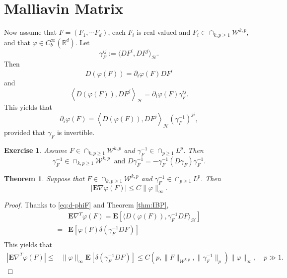 \documentclass[twoside, 12pt]{book}
\numberwithin{equation}{chapter}
\newtheorem{theorem}{Theorem}[section]
\newtheorem{exercise}{Exercise}[section]
\def\cH{{\mathcal H}}
\def\mR{{\mathbb R}}
\def\bE{{\mathbf E}}
\def\sW{{\mathscr W}}
\def\l{\left}
\def\r{\right}
\def\<{\langle}
\def\>{\rangle}
\def\geq{\geqslant}
\def\leq{\leqslant}
\begin{document}
    
    \section{Malliavin Matrix}
    Now assume that $F=(F_1,\cdots F_d)$, each $F_i$ is real-valued and $F_i\in \cap_{k,p\geq 1}\sW^{k,p}$, and that $\varphi\in C^\infty_b(\mR^d)$. Let 
    \[
        \gamma_F^{ij}:= \<DF^i, DF^j\>_{\cH}. 
    \]
    Then 
    \[
        D(\varphi(F))= \partial_i \varphi(F) D F^i
    \]
    and 
    \[
        \left\langle D(\varphi(F)), D F^j\right\rangle_\cH= \partial_i \varphi(F) \gamma_F^{i j} . 
    \]
    This yields that 
    \begin{equation}\label{eq:d-phiF}
    	\partial_i \varphi(F)= \left\langle D(\varphi(F)), D F^j\right\rangle_{\cH}\left(\gamma_F^{-1}\right)^{j i},
    \end{equation}
    provided that $\gamma_{F}$ is invertible. 
    
    \begin{exercise}
    	Assume $F\in \cap_{k,p\geq 1}\sW^{k,p}$ and $\gamma_F^{-1}\in \cap_{p\geq 1} L^{p}$. Then 
    	\[
    	    \gamma_F^{-1}\in  \cap_{k,p\geq 1}\sW^{k,p} ~ \mbox{ and }D\gamma_F^{-1}= -\gamma_F^{-1} (D\gamma_F) \gamma_F^{-1}. 
    	\]
    \end{exercise}
    
    \begin{theorem}
    	Suppose that  $F\in \cap_{k,p\geq 1}\sW^{k,p}$ and $\gamma_F^{-1}\in \cap_{p\geq 1} L^{p}$. Then 
    	\[
    	    \l| \bE \nabla \varphi(F) \r| \leq C \|\varphi\|_\infty. 
    	\]
    \end{theorem}
    \begin{proof}
    	Thanks to \eqref{eq:d-phiF} and Theorem \ref{thm:IBP}, 
    	\begin{equation*}
    		\begin{aligned}
    			&\bE \nabla^T \varphi(F)=\bE \l[  \<D(\varphi(F)), \gamma_{F}^{-1} D F \>_{\cH} \r]\\
    			=& \bE \l[ \varphi(F)   \delta(\gamma_{F}^{-1} D F)\r]\\
    		\end{aligned}
    	\end{equation*}
    	This yields that 
    	\begin{align*}
    		\l| \bE \nabla^T \varphi(F) \r| \leq& \|\varphi\|_\infty  \bE [\delta(\gamma_{F}^{-1} D F)]
    		\leq C(p, \|F\|_{\sW^{k,p}}, \|\gamma_F^{-1}\|_p) \|\varphi\|_\infty, \quad p\gg 1. 
    	\end{align*}
    \end{proof}
    
\end{document}
